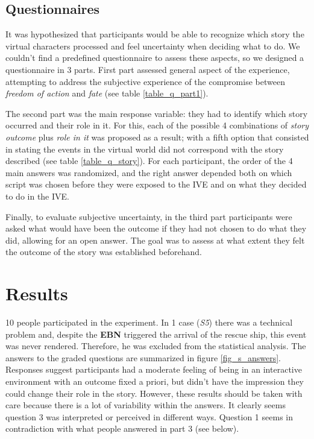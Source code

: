 \documentclass[
		twoside,openright,titlepage,numbers=noenddot,manychapters,
		headinclude,%
                footinclude=false,cleardoublepage=empty,
                BCOR=5mm,
		fontsize=11pt, %
                 enabledeprecatedfontcommands]{scrreprt}
\begin{document}
\subsection{Questionnaires}
It was hypothesized that participants would be able to recognize which story the virtual characters processed and feel uncertainty when deciding what to do. We couldn’t find a predefined questionnaire to assess these aspects, so we designed a questionnaire in 3 parts. First part assessed general aspect of the experience, attempting to address the subjective experience of the compromise between \emph{freedom of action} and \emph{fate} (see table \ref{table_q_part1}). 

The second part was the main response variable: they had to identify which story occurred and their role in it. For this, each of the possible 4 combinations of \emph{story outcome} plus \emph{role in it} was proposed as a result; with a fifth option that consisted in stating the events in the virtual world did not correspond with the story described (see table \ref{table_q_story}). For each participant, the order of the 4 main answers was randomized, and the right answer depended both on which script was chosen before they were exposed to the IVE and on what they decided to do in the IVE.

Finally, to evaluate subjective uncertainty, in the third part participants were asked what would have been the outcome if they had not chosen to do what they did, allowing for an open answer. The goal was to assess at what extent they felt the outcome of the story was established beforehand.

\section{Results}
 10 people participated in the experiment. In 1 case (\emph{S5}) there was a technical problem and, despite the \textbf{EBN} triggered the arrival of the rescue ship, this event was never rendered. Therefore, he was excluded from the statistical analysis. The answers to the graded questions are summarized in figure \ref{fig_s_answers}. Responses suggest participants had a moderate feeling of being in an interactive environment with an outcome fixed a priori, but didn’t have the impression they could change their role in the story. However, these results should be taken with care because there is a lot of variability within the answers. It clearly seems question 3 was interpreted or perceived in different ways. Question 1 seems in contradiction with what people answered in part 3 (see below).
\end{document}
